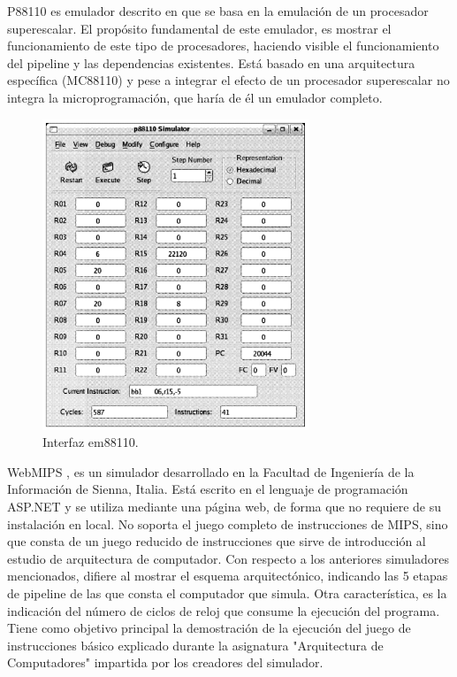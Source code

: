 P88110 es emulador descrito en \cite{garcia2009p88110} que se basa en la emulación de un procesador superescalar. El propósito fundamental de este emulador, es mostrar el funcionamiento de este tipo de procesadores, haciendo visible el funcionamiento del pipeline y las dependencias existentes. Está basado en una arquitectura específica (MC88110) y pese a integrar el efecto de un procesador superescalar no integra la microprogramación, que haría de él un emulador completo.

\begin{figure}[htbp]
 	\centering
 	\includegraphics[width=8cm]{figures/em88110}
 	\caption{Interfaz em88110.}
	\label{fig:p88110_figure}
\end{figure}


WebMIPS \cite{branovic2004webmips}, es un simulador desarrollado en la Facultad de Ingeniería de la Información de Sienna, Italia. Está escrito en el lenguaje de programación ASP.NET y se utiliza mediante una página web, de forma que no requiere de su instalación en local. No soporta el juego completo de instrucciones de MIPS, sino que consta de un juego reducido de instrucciones que sirve de introducción al estudio de arquitectura de computador. Con respecto a los anteriores simuladores mencionados, difiere al mostrar el esquema arquitectónico, indicando las 5 etapas de pipeline de las que consta el computador que simula. Otra característica, es la indicación del número de ciclos de reloj que consume la ejecución del programa. Tiene como objetivo principal la demostración de la ejecución del juego de instrucciones básico explicado durante la asignatura "Arquitectura de Computadores" impartida por los creadores del simulador.

